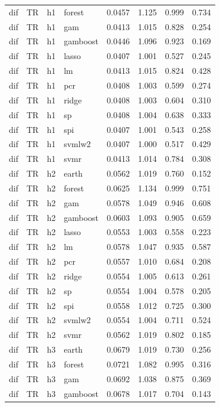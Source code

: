 \begin{ThreePartTable}
\begin{longtable}[t]{llclcccc}
dif & TR & h1 & forest & 0.0457 & 1.125 & 0.999 & 0.734\\
dif & TR & h1 & gam & 0.0413 & 1.015 & 0.828 & 0.254\\
dif & TR & h1 & gamboost & 0.0446 & 1.096 & 0.923 & 0.169\\
dif & TR & h1 & lasso & 0.0407 & 1.001 & 0.527 & 0.245\\
dif & TR & h1 & lm & 0.0413 & 1.015 & 0.824 & 0.428\\
dif & TR & h1 & pcr & 0.0408 & 1.003 & 0.599 & 0.274\\
dif & TR & h1 & ridge & 0.0408 & 1.003 & 0.604 & 0.310\\
dif & TR & h1 & sp & 0.0408 & 1.004 & 0.638 & 0.333\\
dif & TR & h1 & spi & 0.0407 & 1.001 & 0.543 & 0.258\\
dif & TR & h1 & svmlw2 & 0.0407 & 1.000 & 0.517 & 0.429\\
dif & TR & h1 & svmr & 0.0413 & 1.014 & 0.784 & 0.308\\
\addlinespace
dif & TR & h2 & earth & 0.0562 & 1.019 & 0.760 & 0.152\\
dif & TR & h2 & forest & 0.0625 & 1.134 & 0.999 & 0.751\\
dif & TR & h2 & gam & 0.0578 & 1.049 & 0.946 & 0.608\\
dif & TR & h2 & gamboost & 0.0603 & 1.093 & 0.905 & 0.659\\
dif & TR & h2 & lasso & 0.0553 & 1.003 & 0.558 & 0.223\\
dif & TR & h2 & lm & 0.0578 & 1.047 & 0.935 & 0.587\\
dif & TR & h2 & pcr & 0.0557 & 1.010 & 0.684 & 0.208\\
dif & TR & h2 & ridge & 0.0554 & 1.005 & 0.613 & 0.261\\
dif & TR & h2 & sp & 0.0554 & 1.004 & 0.578 & 0.205\\
dif & TR & h2 & spi & 0.0558 & 1.012 & 0.725 & 0.300\\
dif & TR & h2 & svmlw2 & 0.0554 & 1.004 & 0.711 & 0.524\\
dif & TR & h2 & svmr & 0.0562 & 1.019 & 0.802 & 0.185\\
\addlinespace
dif & TR & h3 & earth & 0.0679 & 1.019 & 0.730 & 0.256\\
dif & TR & h3 & forest & 0.0721 & 1.082 & 0.995 & 0.316\\
dif & TR & h3 & gam & 0.0692 & 1.038 & 0.875 & 0.369\\
dif & TR & h3 & gamboost & 0.0678 & 1.017 & 0.704 & 0.143\\

\end{longtable}
\end{ThreePartTable}
